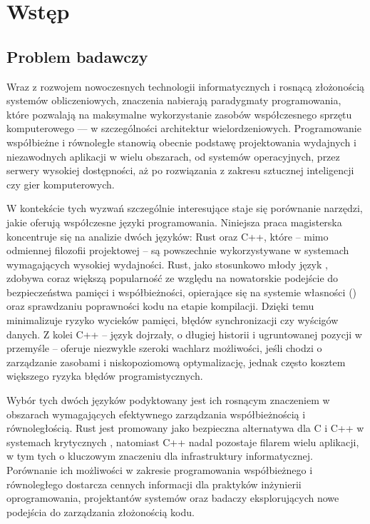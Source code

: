 \chapter[Wstęp]{Wstęp}
\section{Problem badawczy}
Wraz z rozwojem nowoczesnych technologii informatycznych i rosnącą złożonością systemów obliczeniowych, znaczenia nabierają paradygmaty programowania, które pozwalają na maksymalne wykorzystanie zasobów współczesnego sprzętu komputerowego — w szczególności architektur wielordzeniowych. Programowanie współbieżne i równoległe stanowią obecnie podstawę projektowania wydajnych i niezawodnych aplikacji w wielu obszarach, od systemów operacyjnych, przez serwery wysokiej dostępności, aż po rozwiązania z zakresu sztucznej inteligencji czy gier komputerowych.

W kontekście tych wyzwań szczególnie interesujące staje się porównanie narzędzi, jakie oferują współczesne języki programowania. Niniejsza praca magisterska koncentruje się na analizie dwóch języków: Rust oraz C++, które – mimo odmiennej filozofii projektowej – są powszechnie wykorzystywane w systemach wymagających wysokiej wydajności. Rust, jako stosunkowo młody język \cite{}, zdobywa coraz większą popularność\cite{} ze względu na nowatorskie podejście do bezpieczeństwa pamięci i współbieżności, opierające się na systemie własności () oraz sprawdzaniu poprawności kodu na etapie kompilacji. Dzięki temu minimalizuje ryzyko wycieków pamięci, błędów synchronizacji czy wyścigów danych. Z kolei C++ – język dojrzały, o długiej historii i ugruntowanej pozycji w przemyśle – oferuje niezwykle szeroki wachlarz możliwości, jeśli chodzi o zarządzanie zasobami i niskopoziomową optymalizację, jednak często kosztem większego ryzyka błędów programistycznych.

Wybór tych dwóch języków podyktowany jest ich rosnącym znaczeniem w obszarach wymagających efektywnego zarządzania współbieżnością i równoległością. Rust jest promowany jako bezpieczna alternatywa dla C i C++ w systemach krytycznych \cite{}, natomiast C++ nadal pozostaje filarem wielu aplikacji, w tym tych o kluczowym znaczeniu dla infrastruktury informatycznej. Porównanie ich możliwości w zakresie programowania współbieżnego i równoległego dostarcza cennych informacji dla praktyków inżynierii oprogramowania, projektantów systemów oraz badaczy eksplorujących nowe podejścia do zarządzania złożonością kodu.

